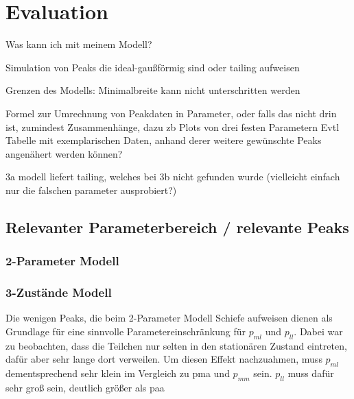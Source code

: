 
\chapter{Evaluation}
\label{chapter:eva}

Was kann ich mit meinem Modell?

Simulation von Peaks die ideal-gaußförmig sind oder tailing aufweisen

Grenzen des Modells:
Minimalbreite kann nicht unterschritten werden

Formel zur Umrechnung von Peakdaten in Parameter, oder falls das nicht drin ist, zumindest Zusammenhänge, dazu zb Plots von drei festen Parametern
Evtl Tabelle mit exemplarischen Daten, anhand derer weitere gewünschte Peaks angenähert werden können?

3a modell liefert tailing, welches bei 3b nicht gefunden wurde (vielleicht einfach nur die falschen parameter ausprobiert?)

\section{Relevanter Parameterbereich / relevante Peaks}


\subsection{2-Parameter Modell}


\subsection{3-Zustände Modell}


Die wenigen Peaks, die beim 2-Parameter Modell Schiefe aufweisen dienen als Grundlage für eine sinnvolle Parametereinschränkung für $p_{ml}$ und $p_{ll}$. Dabei war zu beobachten, dass die Teilchen nur selten in den stationären Zustand eintreten, dafür aber sehr lange dort verweilen. Um diesen Effekt nachzuahmen, muss $p_{ml}$ dementsprechend sehr klein im Vergleich zu pma und $p_{mm}$ sein. $p_{ll}$ muss dafür sehr groß sein, deutlich größer als paa

